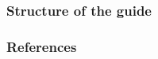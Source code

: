 \documentclass[aspectratio=169,draft,progrbar]{Classes/beamerLct}%
\begin{document}
\maketitle

\begin{frame}
  \frametitle{Structure of the guide}
  \tableofcontents
\end{frame}








% 
% 


\makeqahour


\ifdefinePrintbib
  \begin{frame}[t,allowframebreaks]
    \frametitle{References}
    \printbibliography
  \end{frame}
\fi

% 


\end{document}
